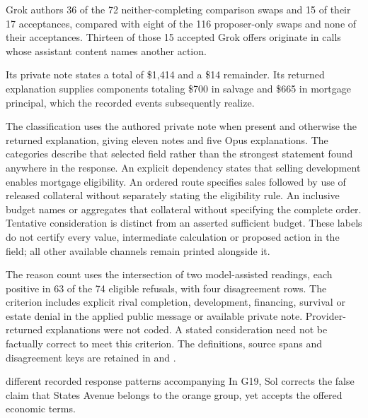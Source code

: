 
Grok authors 36 of the 72 neither-completing comparison swaps and 15 of
their 17 acceptances, compared with eight of the 116 proposer-only swaps
and none of their acceptances. Thirteen of those 15 accepted Grok offers
originate in calls whose assistant content names another action.

Its private note states a total of \$1,414 and a \$14 remainder. Its returned
explanation supplies components totaling \$700 in salvage and \$665 in
mortgage principal, which the recorded events subsequently realize.

The classification uses the authored private note when present and otherwise
the returned explanation, giving eleven notes and five Opus explanations.
The categories describe that selected field rather than the strongest
statement found anywhere in the response. An explicit dependency states that
selling development enables mortgage eligibility. An ordered route specifies
sales followed by use of released collateral without separately stating the
eligibility rule. An inclusive budget names or aggregates that collateral
without specifying the complete order. Tentative consideration is distinct
from an asserted sufficient budget. These labels do not certify every value,
intermediate calculation or proposed action in the field; all other available
channels remain printed alongside it.

The reason count uses the intersection of two model-assisted readings, each
positive in 63 of the 74 eligible refusals, with four disagreement rows.
The criterion includes explicit rival completion, development, financing,
survival or estate denial in the applied public message or available private
note. Provider-returned explanations were not coded. A stated consideration
need not be factually correct to meet this criterion. The definitions,
source spans and disagreement keys are retained in
and
.

different recorded response patterns accompanying
In G19, Sol corrects the false claim that States Avenue belongs to the orange
group, yet accepts the offered economic terms.

